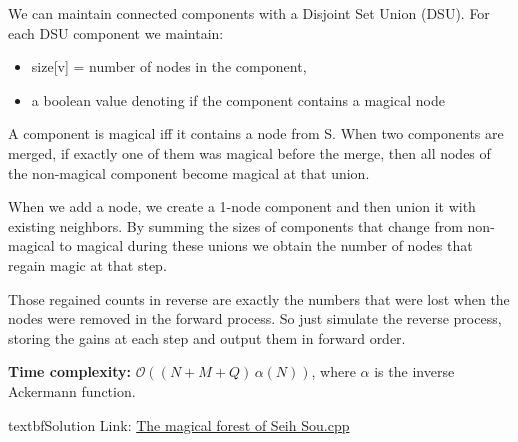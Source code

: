 \documentclass{article}
\newcommand{\gr}[1]{\foreignlanguage{greek}{#1}}
\begin{document}
    \noindent
        We can maintain connected components with a Disjoint Set Union (DSU). For each DSU component we maintain:
        \begin{itemize}
            \item size[v] = number of nodes in the component,
            \item a boolean value denoting if the component contains a magical node
        \end{itemize}
    
    \noindent
        A component is magical iff it contains a node from S. When two components are merged, if exactly one of them was magical before the merge, then all nodes of the non-magical component become magical at that union. %
    
    \noindent
        When we add a node, we create a 1-node component and then union it with existing neighbors. By summing the sizes of components that change from non-magical to magical during these unions we obtain the number of nodes that regain magic at that step.
    
    \vspace{0.5em}
    
    \noindent
        Those regained counts in reverse are exactly the numbers that were lost when the nodes were removed in the forward process. So just simulate the reverse process, storing the gains at each step and output them in forward order.
        
    \vspace{1em}
    
    \noindent\textbf{Time complexity:} \(\mathcal{O}((N+M+Q)\,\alpha(N))\), where \(\alpha\) is the inverse Ackermann function. %
    
    
    \vspace{1em}
    
    \noindent
    textbf{Solution Link:} \href{https://github.com/StathisKons/GRCPC-2024-Editorial-Implementations/blob/main/H.%20The%20magical%20forest%20of%20Seih%20Sou.cpp}{The magical forest of Seih Sou.cpp}
    
\end{document}
